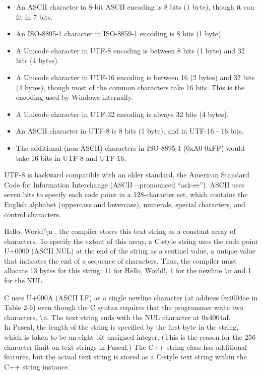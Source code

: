 \documentclass[12pt]{extarticle}
\begin{document}
\vspace{10pt}
\begin{itemize}\raggedright
  \item An ASCII character in 8-bit ASCII encoding is 8 bits (1 byte), though it can fit
        in 7 bits.
  \item An ISO-8895-1 character in ISO-8859-1 encoding is 8 bits (1 byte).
  \item A Unicode character in UTF-8 encoding is between 8 bits (1 byte) and 32 bits (4 bytes).
  \item A Unicode character in UTF-16 encoding is between 16 (2 bytes) and 32 bits (4 bytes),
        though most of the common characters take 16 bits. This is the encoding used by Windows internally.
  \item A Unicode character in UTF-32 encoding is always 32 bits (4 bytes).
  \item An ASCII character in UTF-8 is 8 bits (1 byte), and in UTF-16 - 16 bits.
  \item The additional (non-ASCII) characters in ISO-8895-1 (0xA0-0xFF) would take 16 bits
        in UTF-8 and UTF-16.
\end{itemize}

\vspace{18pt}
UTF-8 is backward compatible with an older standard, the American Standard Code for Information
Interchange (ASCII—pronounced “ask-ee”). ASCII uses seven bits to specify each code point 
in a 128-character set, which contains the English alphabet (uppercase and lowercase), 
numerals, special characters, and control characters.

\vspace{18pt}
Hello, World!\textbackslash n , the compiler stores this text string as a constant array 
of characters. To specify the extent of this array, a C-style string uses the code point 
U+0000 (ASCII NUL) at the end of the string as a sentinel value, a unique value that 
indicates the end of a sequence of characters. Thus, the compiler must allocate 13 bytes 
for this string: 11 for Hello, World!, 1 for the newline \textbackslash n and 1 for the NUL.

\vspace{18pt}
C uses U+000A (ASCII LF) as a single newline character (at address 0x4004ae in Table 2-6) 
even though the C syntax requires that the programmer write two characters, \textbackslash n.
The text string ends with the NUL character at 0x4004af. \\
In Pascal, the length of the string is specified by the first byte in the string, which 
is taken to be an eight-bit unsigned integer. (This is the reason for the 256-character 
limit on text strings in Pascal.) The C++ string class has additional features, but the 
actual text string is stored as a C-style text string within the C++ string instance.
\end{document}
